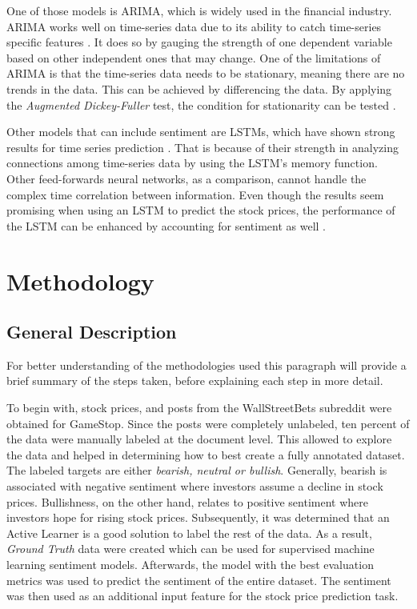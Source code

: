 \documentclass[11pt, a4paper]{article}
\begin{document}
One of those models is ARIMA, which is widely used in the financial industry. ARIMA works well on time-series data due to its
ability to catch time-series specific features \citep{vuong2021forecasting}. It does so by gauging the strength of one dependent variable based on other independent
ones that may change. One of the limitations of ARIMA is that the time-series data needs to be stationary, meaning there are no trends in the data.
This can be achieved by differencing the data.
By applying the \emph{Augmented Dickey-Fuller} test, the condition for stationarity can be tested \citep{ivanovic2013arima}.

Other models that can include sentiment are LSTMs, which have shown strong results for time series prediction \citep{rammurthy2021lstm}. That is because of their strength in 
analyzing connections among time-series data by using the LSTM's memory function. Other feed-forwards neural networks, as a comparison, cannot handle the complex 
time correlation between information. Even though the results seem promising when using an LSTM to predict the stock prices, the performance of the LSTM 
can be enhanced by accounting for sentiment as well \citep{jin2020lstmsentiment, wang2019forecasting}.




\section{Methodology}

\subsection{General Description} \label{general_description}

For better understanding of the methodologies used this paragraph will provide a brief summary of the steps taken, before
explaining each step in more detail.

To begin with, stock prices, and posts from the WallStreetBets subreddit were obtained for GameStop. Since the posts were completely
unlabeled, ten percent of the data were manually labeled at the document level. This allowed to explore the data and helped in determining how to best create a fully annotated dataset.
The labeled targets are either \emph{bearish, neutral or bullish}. Generally, bearish is associated with negative 
sentiment where investors assume a decline in stock prices. Bullishness, on the other hand, relates to positive sentiment where investors hope for rising stock prices.
Subsequently, it was determined that an Active Learner is a good solution to label the rest of the data. As a result, \emph{Ground Truth} data were created which can be used
for supervised machine learning sentiment models. Afterwards, the model with the best evaluation metrics was used to predict the sentiment of the entire
dataset. The sentiment was then used as an additional input feature for the stock price prediction task.
\end{document}
